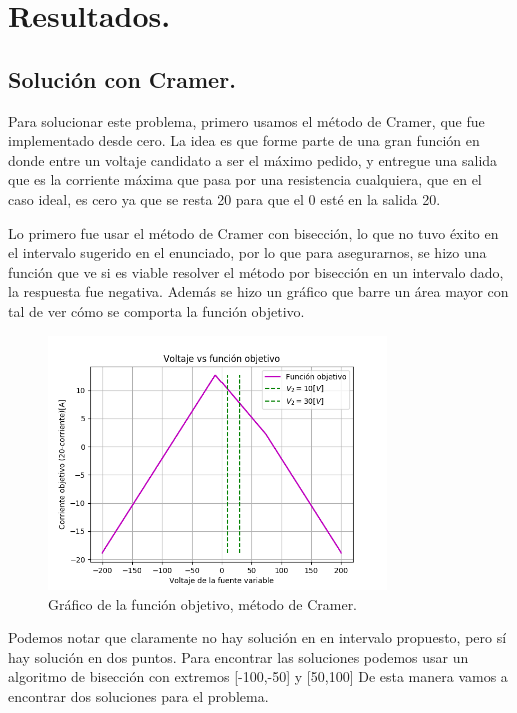 \documentclass[letter, 11pt]{article}
\begin{document}
\section{Resultados.}

\subsection{Solución con Cramer.}



Para solucionar este problema, primero usamos el método de Cramer, que fue implementado desde cero. La idea es que forme parte de una gran función en donde entre un voltaje candidato a ser el máximo pedido, y entregue una salida que es la corriente máxima que pasa por una resistencia cualquiera, que en el caso ideal, es cero ya que se resta 20 para que el 0 esté en la salida 20.

Lo primero fue usar el método de Cramer con bisección, lo que no tuvo éxito en el intervalo sugerido en el enunciado, por lo que para asegurarnos, se hizo una función que ve si es viable resolver el método por bisección en un intervalo dado, la respuesta fue negativa. Además se hizo un gráfico que barre un área mayor con tal de ver cómo se comporta la función objetivo.


\begin{figure}[h]
 \centering
 \includegraphics[width=0.8\textwidth]{./img1.png}
 \caption{Gráfico de la función objetivo, método de Cramer.}
\end{figure}

Podemos notar que claramente no hay solución en en intervalo propuesto, pero sí hay solución en dos puntos. Para encontrar las soluciones podemos usar un algoritmo de bisección con extremos [-100,-50] y [50,100] De esta manera vamos a encontrar dos soluciones para el problema.
\end{document}
